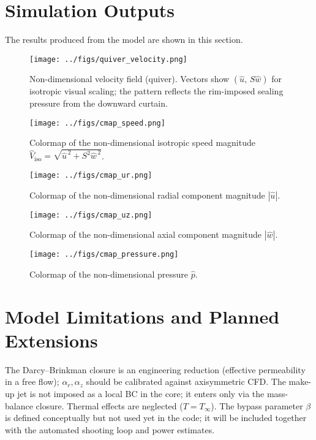 \documentclass[11pt,a4paper]{article}
\begin{document}
\section{Simulation Outputs}
The results produced from the model are shown in this section.
\begin{figure}[H]
  \centering
  \texttt{[image: ../figs/quiver\_velocity.png]}
  \caption{Non-dimensional velocity field (quiver).
Vectors show $(\hat u,\,S\hat w)$ for isotropic visual scaling; the pattern reflects the rim-imposed sealing pressure from the downward curtain.}
  \label{fig:quiver}
\end{figure}

\begin{figure}[H]
  \centering
  \texttt{[image: ../figs/cmap\_speed.png]}
  \caption{Colormap of the non-dimensional isotropic speed magnitude $\hat V_{\mathrm{iso}}=\sqrt{\hat u^{\,2}+S^{2}\hat w^{\,2}}$.}
  \label{fig:cmap_speed}
\end{figure}

\begin{figure}[H]
  \centering
  \texttt{[image: ../figs/cmap\_ur.png]}
  \caption{Colormap of the non-dimensional radial component magnitude $|\hat u|$.}
  \label{fig:cmap_ur}
\end{figure}

\begin{figure}[H]
  \centering
  \texttt{[image: ../figs/cmap\_uz.png]}
  \caption{Colormap of the non-dimensional axial component magnitude $|\hat w|$.}
  \label{fig:cmap_uz}
\end{figure}

\begin{figure}[H]
  \centering
  \texttt{[image: ../figs/cmap\_pressure.png]}
  \caption{Colormap of the non-dimensional pressure $\hat p$.}
  \label{fig:cmap_p}
\end{figure}

\section{Model Limitations and Planned Extensions}
The Darcy--Brinkman closure is an engineering reduction (effective permeability in a
free flow); $\alpha_r,\alpha_z$ should be calibrated against axisymmetric CFD.
The make-up jet is not imposed as a local BC in the core; it enters only via the
mass-balance closure. Thermal effects are neglected ($T=T_\infty$). The bypass parameter
$\beta$ is defined conceptually but not used yet in the code; it will be included together
with the automated shooting loop and power estimates.
\end{document}
